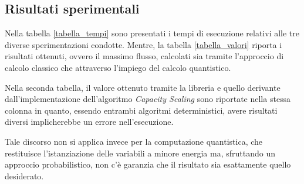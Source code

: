 \documentclass{article}
\begin{document}
\subsection{Risultati sperimentali}
Nella tabella \ref{tabella_tempi} sono presentati i tempi di esecuzione relativi alle tre diverse sperimentazioni condotte. Mentre, la tabella \ref{tabella_valori} riporta i risultati ottenuti, ovvero il massimo flusso, calcolati sia tramite l'approccio di calcolo classico che attraverso l'impiego del calcolo quantistico.

Nella seconda tabella, il valore ottenuto tramite la libreria e quello derivante dall'implementazione dell'algoritmo \emph{Capacity Scaling} sono riportate nella stessa colonna in quanto, essendo entrambi algoritmi deterministici, avere risultati diversi implicherebbe un errore nell'esecuzione.

Tale discorso non si applica invece per la computazione quantistica, che restituisce l'istanziazione delle variabili a minore energia ma, sfruttando un approccio probabilistico, non c'è garanzia che il risultato sia esattamente quello desiderato.
\end{document}

